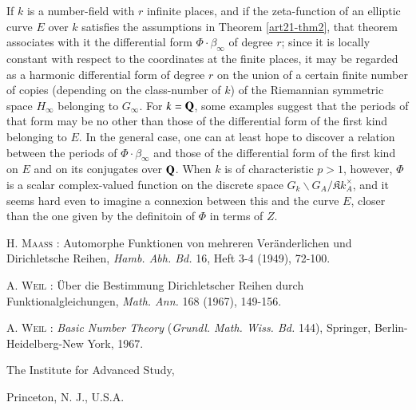 If $k$ is a number-field with $r$ infinite places, and if the zeta-function of an elliptic curve $E$ over $k$ satisfies the assumptions in Theorem \ref{art21-thm2}, that theorem associates with it the differential form $\Phi\cdot \beta_{\infty}$ of degree $r$; since it is locally constant with respect to the coordinates at the finite places, it may be regarded as a harmonic differential form of degree $r$ on the union of a certain finite number of copies (depending on the class-number of $k$) of the Riemannian symmetric space $H_{\infty}$ belonging to $G_{\infty}$. For $k=\mathbf{Q}$, some examples suggest that the periods of that form may be no other than those of the differential form of the first kind belonging to $E$. In the general case, one can at least hope to discover a relation between the periods of $\Phi\cdot \beta_{\infty}$ and those of the differential form of the first kind on $E$ and on its conjugates over $\mathbf{Q}$. When $k$ is of characteristic $p>1$, however, $\Phi$ is a scalar complex-valued function on the discrete space $G_{k}\backslash G_{A}/\mathfrak{K}k^{\times}_{A}$, and it seems hard even to imagine a connexion between this and the curve $E$, closer than the one given by the definitoin of $\Phi$ in terms of $Z$.

\begin{thebibliography}{99}
 \textsc{H. Maass :} Automorphe Funktionen von mehreren Ver\"anderlichen und Dirichletsche Reihen, {\em Hamb. Abh. Bd.} 16, Heft 3-4 (1949), 72-100.

 \textsc{A. Weil :} \"Uber die Bestimmung Dirichletscher Reihen durch Funktionalgleichungen, {\em Math. Ann.} 168 (1967), 149-156.

 \textsc{A. Weil :} {\em Basic Number Theory} ({\em Grundl. Math. Wiss. Bd.} 144), Springer, Berlin-Heidelberg-New York, 1967.

\end{thebibliography}

\bigskip

\noindent
{\small The Institute for Advanced Study,}

\noindent
{\small Princeton, N. J., U.S.A.}


